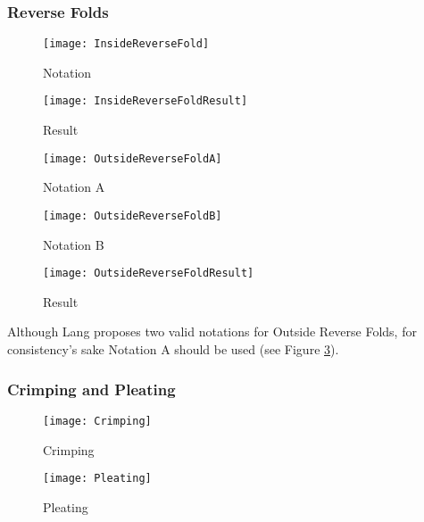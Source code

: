 \subsubsection*{Reverse Folds}

\begin{figure*}[htbp]
	\centering
	\begin{subfigure}{0.3\textwidth}
		\texttt{[image: InsideReverseFold]}
		\caption{Notation}
		\label{fig:insideReverseFoldA}
	\end{subfigure}
	\begin{subfigure}{0.3\textwidth}
		\texttt{[image: InsideReverseFoldResult]}
		\caption{Result}
		\label{fig:insideReverseFoldResult}
	\end{subfigure}
	\caption{Inside Reverse Fold}
	\label{fig:insideReverseFold}
\end{figure*}
\begin{figure*}
	\begin{subfigure}{0.3\textwidth}
		\texttt{[image: OutsideReverseFoldA]}
		\caption{Notation A}
		\label{fig:outsideReverseFoldA}
	\end{subfigure}
	\begin{subfigure}{0.3\textwidth}
		\texttt{[image: OutsideReverseFoldB]}
		\caption{Notation B}
		\label{fig:outsideReverseFoldB}
	\end{subfigure}
	\begin{subfigure}{0.3\textwidth}
		\texttt{[image: OutsideReverseFoldResult]}
		\caption{Result}
		\label{fig:outsideReverseFoldResult}
	\end{subfigure}
	\caption{Outside Reverse Fold}
	\label{fig:outsideReverseFold}
\end{figure*}
\noindent Although Lang proposes two valid notations for Outside Reverse Folds, for consistency's sake Notation A should be used (see Figure \ref{fig:outsideReverseFoldA}).

\newpage
\subsubsection*{Crimping and Pleating}
\begin{figure*}[htbp]
	\centering
	\begin{subfigure}{0.49\textwidth}
		\texttt{[image: Crimping]}
		\caption{Crimping}
		\label{fig:crimping}
	\end{subfigure}
	\begin{subfigure}{0.49\textwidth}
		\texttt{[image: Pleating]}
		\caption{Pleating}
		\label{fig:pleating}
	\end{subfigure}
\end{figure*}

